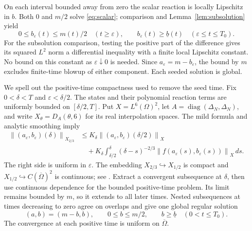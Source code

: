 \documentclass[11pt]{article}
\theoremstyle{definition}
\newcommand{\Om}{\Omega}
\newcommand{\ub}{\underline b}
\newcommand{\norm}[1]{\left\lVert#1\right\rVert}
\begin{document}
On each interval bounded away from zero the scalar reaction is locally
Lipschitz in $b$. Both $0$ and $m/2$ solve \eqref{eq:scalar}; comparison
and Lemma~\ref{lem:subsolution} yield
\begin{equation}\label{eq:approx-bounds}
 0\le b_\varepsilon(t)\le m(t)/2\quad(t\ge\varepsilon),\qquad
 b_\varepsilon(t)\ge\ub(t)\quad(\varepsilon\le t\le T_0).
\end{equation}
For the subsolution comparison, testing the positive part of the difference
gives its squared $L^2$ norm a differential inequality with a finite local
Lipschitz constant. No bound on this constant as $\varepsilon\downarrow0$
is needed. Since $a_\varepsilon=m-b_\varepsilon$, the bound by $m$ excludes
finite-time blowup of either component. Each seeded solution is global.

We spell out the positive-time compactness used to remove the seed time.
Fix $0<\delta<T$ and $\varepsilon<\delta/2$. The states and their polynomial
reaction terms are uniformly bounded on $[\delta/2,T]$. Put
$X=L^6(\Om)^2$, let $A=\operatorname{diag}(\Delta_N,\Delta_N)$, and write
$X_\theta=D_A(\theta,6)$ for its real interpolation spaces. The mild formula
and analytic smoothing imply
\begin{align*}
 \norm{(a_\varepsilon,b_\varepsilon)(\delta)}_{X_{2/3}}
 &\le K_\delta\norm{(a_\varepsilon,b_\varepsilon)(\delta/2)}_X\\
 &\quad+K_\delta\int_{\delta/2}^\delta(\delta-s)^{-2/3}
                 \norm{f(a_\varepsilon(s),b_\varepsilon(s))}_X\,ds.
\end{align*}
The right side is uniform in $\varepsilon$. The embedding
$X_{2/3}\hookrightarrow X_{1/2}$ is compact and
$X_{1/2}\hookrightarrow C(\overline\Om)^2$ is continuous; see
\cite[Proposition~2.13, Theorem~2.14 and Example~3.7]{SchnaubeltNonlinear}.
Extract a convergent subsequence at $\delta$, then use continuous dependence
for the bounded positive-time problem. Its limit remains bounded by $m$,
so it extends to all later times. Nested subsequences at times decreasing
to zero agree on overlaps and give one global regular solution
\begin{equation}\label{eq:limit}
 (a,b)=(m-b,b),\qquad0\le b\le m/2,
 \qquad b\ge\ub\quad(0<t\le T_0).
\end{equation}
The convergence at each positive time is uniform on $\overline\Om$.
\end{document}
